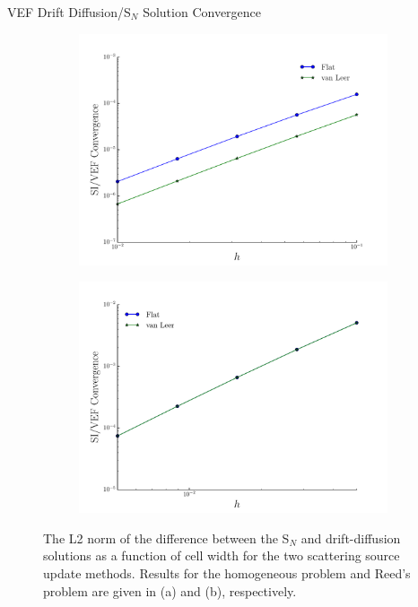 \documentclass[10pt]{beamer}
\newcommand{\SN}{S$_N$\xspace}
\begin{document}
\begin{frame}{VEF Drift Diffusion/\SN Solution Convergence}

	\begin{figure}[htb]
		\centering
		\begin{subfigure}{.5\textwidth}
			\centering
			\includegraphics[width=\textwidth]{figs/solconv_homo.pdf}
			\caption{}
			\label{fig:homo}
		\end{subfigure}
		\hspace{-2em}
		\begin{subfigure}{.5\textwidth}
			\centering
			\includegraphics[width=\textwidth]{figs/solconv_reed.pdf}
			\caption{}
			\label{fig:reed}
		\end{subfigure}
		\caption{The L2 norm of the difference between the \SN and drift-diffusion solutions as a function of cell width for the two scattering source update methods. Results for the homogeneous problem and Reed's problem are given in (a) and (b), respectively.}
	\end{figure}

\end{frame}
\end{document}
